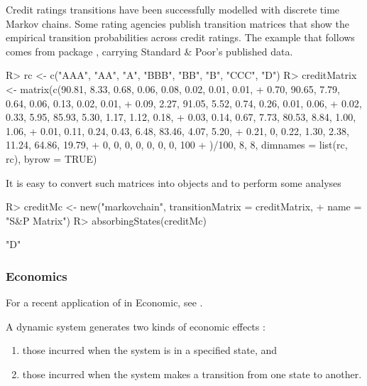 \documentclass[nojss]{jss}
\begin{document}
Credit ratings transitions have been successfully modelled with discrete time Markov chains. Some rating agencies publish transition matrices that show the empirical transition probabilities across credit ratings. The example that follows 
comes from   package \citep{CreditMetricsR},
carrying Standard \& Poor's published data.

\begin{Schunk}
\begin{Sinput}
R> rc <- c("AAA", "AA", "A", "BBB", "BB", "B", "CCC", "D")
R> creditMatrix <- matrix(c(90.81, 8.33, 0.68, 0.06, 0.08, 0.02, 0.01, 0.01,
+  0.70, 90.65, 7.79, 0.64, 0.06, 0.13, 0.02, 0.01,
+  0.09, 2.27, 91.05, 5.52, 0.74, 0.26, 0.01, 0.06,
+  0.02, 0.33, 5.95, 85.93, 5.30, 1.17, 1.12, 0.18,
+  0.03, 0.14, 0.67, 7.73, 80.53, 8.84, 1.00, 1.06,
+  0.01, 0.11, 0.24, 0.43, 6.48, 83.46, 4.07, 5.20,
+  0.21, 0, 0.22, 1.30, 2.38, 11.24, 64.86, 19.79,
+  0, 0, 0, 0, 0, 0, 0, 100
+  )/100, 8, 8, dimnames = list(rc, rc), byrow = TRUE)
\end{Sinput}
\end{Schunk}

It is easy to convert such matrices into  objects and to perform some analyses

\begin{Schunk}
\begin{Sinput}
R> creditMc <- new("markovchain", transitionMatrix = creditMatrix, 
+                  name = "S&P Matrix")
R> absorbingStates(creditMc)
\end{Sinput}
\begin{Soutput}
[1] "D"
\end{Soutput}
\end{Schunk}

\subsubsection{Economics}\label{fin:ec}

For a recent application of  in Economic, see \cite{manchesterR}. 

A dynamic system generates two kinds of economic effects \citep{bardPpt}:
\begin{enumerate}
\item those incurred when the system is in a specified state, and
\item those incurred when the system makes a transition from one state to another.
\end{enumerate}
\end{document}
